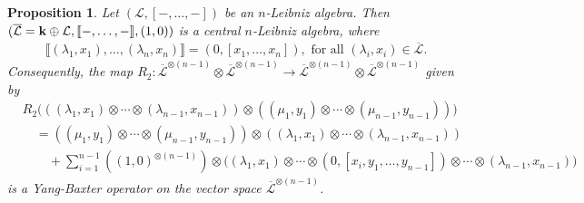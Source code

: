 \documentclass[a4paper,reqno,10pt]{amsart}
\theoremstyle{plain}
\newtheorem{prop}[thm]{Proposition}
\theoremstyle{definition}
\theoremstyle{remark}
\begin{document}
\begin{prop}\label{nl-cnl}
    Let $(\mathcal{L}, [-, \ldots, -])$ be an $n$-Leibniz algebra. Then $(\overline{\mathcal{L}} = {\bf k} \oplus \mathcal{L}, \llbracket -, \ldots, - \rrbracket ,(1, 0))$ is a central $n$-Leibniz algebra, where
    \begin{align*}
        \llbracket (\lambda_1, x_1), \ldots, (\lambda_n, x_n ) \rrbracket = (0, [x_1, \ldots, x_n]), \text{ for all } (\lambda_i, x_i) \in \overline{\mathcal{L}}.
    \end{align*}
    Consequently, the map $R_2 : \overline{\mathcal{L}}^{\otimes (n-1)} \otimes \overline{\mathcal{L}}^{\otimes (n-1)} \rightarrow \overline{\mathcal{L}}^{\otimes (n-1)} \otimes \overline{\mathcal{L}}^{\otimes (n-1)}$ given by
    \begin{align*}
        &R_2 \big( ( (\lambda_1, x_1) \otimes \cdots \otimes (\lambda_{n-1}, x_{n-1})) \otimes ( (\mu_1, y_1) \otimes \cdots \otimes (\mu_{n-1}, y_{n-1}))  \big) \\
        & \quad = ( (\mu_1, y_1) \otimes \cdots \otimes (\mu_{n-1}, y_{n-1})) \otimes ( (\lambda_1, x_1) \otimes \cdots \otimes (\lambda_{n-1}, x_{n-1})) \\
        & \qquad + \sum_{i=1}^{n-1} ((1, 0)^{\otimes (n-1)} ) \otimes \big(   (\lambda_1, x_1) \otimes \cdots \otimes (0, [x_i, y_1, \ldots, y_{n-1}]) \otimes \cdots \otimes (\lambda_{n-1}, x_{n-1})  \big)
    \end{align*}
    is a Yang-Baxter operator on the vector space $\overline{\mathcal{L}}^{\otimes (n-1)} $.
\end{prop}
\end{document}
